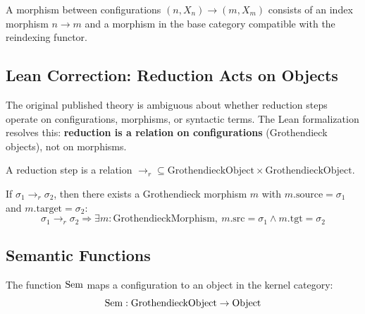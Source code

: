 \begin{definition}
A morphism between configurations $(n, X_n) \to (m, X_m)$ consists of an index
morphism $n \to m$ and a morphism in the base category compatible with the
reindexing functor.
\end{definition}

\subsection{Lean Correction: Reduction Acts on Objects}

\begin{correction}
The original published theory is ambiguous about whether reduction steps operate
on configurations, morphisms, or syntactic terms. The Lean formalization resolves
this: \textbf{reduction is a relation on configurations} (Grothendieck objects),
not on morphisms.
\end{correction}

\begin{definition}
A reduction step is a relation
$\to_r \subseteq \mathrm{GrothendieckObject} \times \mathrm{GrothendieckObject}$.
\end{definition}

\begin{theorem}
If $\sigma_1 \to_r \sigma_2$, then there exists a Grothendieck morphism $m$ with
$m.\mathrm{source} = \sigma_1$ and $m.\mathrm{target} = \sigma_2$:
\[
  \sigma_1 \to_r \sigma_2
  \Rightarrow
  \exists m : \mathrm{GrothendieckMorphism},\
  m.\mathrm{src} = \sigma_1 \wedge m.\mathrm{tgt} = \sigma_2
\]
\end{theorem}

\subsection{Semantic Functions}

\begin{definition}
The function $\mathrm{Sem}$ maps a configuration to an object in the kernel category:
\[
  \mathrm{Sem} : \mathrm{GrothendieckObject} \to \mathrm{Object}
\]
\end{definition}

